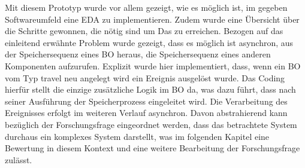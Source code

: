 Mit diesem Prototyp wurde vor allem gezeigt, wie es möglich ist, im gegeben Softwareumfeld eine \ac{EDA} zu implementieren. Zudem wurde eine Übersicht über die Schritte gewonnen, die nötig sind um Das zu erreichen. Bezogen auf das einleitend erwähnte Problem wurde gezeigt, dass es möglich ist asynchron, aus der Speichersequenz eines \ac{BO} heraus, die Speichersequenz eines anderen Komponenten aufzurufen. Explizit wurde hier implementiert, dass, wenn ein BO vom Typ travel neu angelegt wird ein Ereignis ausgelöst wurde. Das Coding hierfür stellt die einzige zusätzliche Logik im BO da, was dazu führt, dass nach seiner Ausführung der Speicherprozess eingeleitet wird. Die Verarbeitung des Ereignisses erfolgt im weiteren Verlauf asynchron.
Davon abstrahierend kann bezüglich der Forschungsfrage eingeordnet werden, dass das betrachtete System durchaus ein komplexes System darstellt, was im folgenden Kapitel eine Bewertung in diesem Kontext und eine weitere Bearbeitung der Forschungsfrage zulässt.\\